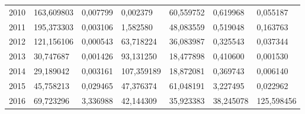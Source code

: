 \begin{table}
\begin{tabular}{p{1cm}p{2cm}p{2cm}p{2cm}p{2cm}p{2cm}p{2cm}}
 2010 &                163,609803 &          0,007799 &             0,002379 &                  60,559752 &                       0,619968 &                      0,055187 \\
 2011 &                195,373303 &          0,003106 &             1,582580 &                  48,083559 &                       0,519048 &                      0,163763 \\
 2012 &                121,156106 &          0,000543 &            63,718224 &                  36,083987 &                       0,325543 &                      0,037344 \\
 2013 &                 30,747687 &          0,001426 &            93,131250 &                  18,477898 &                       0,410600 &                      0,001530 \\
 2014 &                 29,189042 &          0,003161 &           107,359189 &                  18,872081 &                       0,369743 &                      0,006140 \\
 2015 &                 45,758213 &          0,029465 &            47,376374 &                  61,048191 &                       3,227495 &                      0,022962 \\
 2016 &                 69,723296 &          3,336988 &            42,144309 &                  35,923383 &                      38,245078 &                    125,598456 \\
\bottomrule
\end{tabular}
\end{table}
